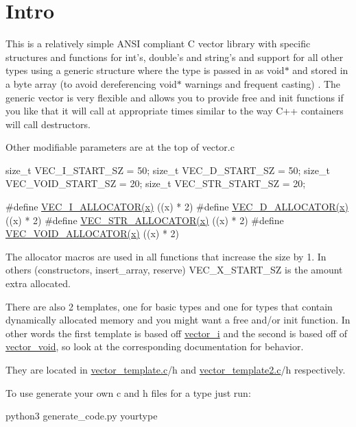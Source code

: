 \hypertarget{index_Intro}{}\section{Intro}\label{index_Intro}
This is a relatively simple A\-N\-S\-I compliant C vector library with specific structures and functions for int's, double's and string's and support for all other types using a generic structure where the type is passed in as void$\ast$ and stored in a byte array (to avoid dereferencing void$\ast$ warnings and frequent casting) . The generic vector is very flexible and allows you to provide free and init functions if you like that it will call at appropriate times similar to the way C++ containers will call destructors.

Other modifiable parameters are at the top of vector.\-c 
\begin{DoxyPre}
size\_t VEC\_I\_START\_SZ = 50;
size\_t VEC\_D\_START\_SZ = 50;
size\_t VEC\_VOID\_START\_SZ = 20;
size\_t VEC\_STR\_START\_SZ = 20;\end{DoxyPre}



\begin{DoxyPre}#define \hyperlink{vector__i_8c_a6d9a8fd1aaa4a8df09d79da016a5c5aa}{VEC\_I\_ALLOCATOR(x)} ((x) * 2)
#define \hyperlink{vector__d_8c_a024a194564bd2419ca1ac75e3cdec3e8}{VEC\_D\_ALLOCATOR(x)} ((x) * 2)
#define \hyperlink{vector__str_8c_ac6b46abc3594994ede1811c5268fa72f}{VEC\_STR\_ALLOCATOR(x)} ((x) * 2)
#define \hyperlink{vector__void_8c_a6f86fe931c02dfbb3d901d2f5e5ec969}{VEC\_VOID\_ALLOCATOR(x)} ((x) * 2)
\end{DoxyPre}
 The allocator macros are used in all functions that increase the size by 1. In others (constructors, insert\-\_\-array, reserve) V\-E\-C\-\_\-\-X\-\_\-\-S\-T\-A\-R\-T\-\_\-\-S\-Z is the amount extra allocated.

There are also 2 templates, one for basic types and one for types that contain dynamically allocated memory and you might want a free and/or init function. In other words the first template is based off \hyperlink{structvector__i}{vector\-\_\-i} and the second is based off of \hyperlink{structvector__void}{vector\-\_\-void}, so look at the corresponding documentation for behavior.

They are located in \hyperlink{vector__template_8c}{vector\-\_\-template.\-c}/h and \hyperlink{vector__template2_8c}{vector\-\_\-template2.\-c}/h respectively.

To use generate your own c and h files for a type just run\-: 
\begin{DoxyPre}
python3 generate\_code.py yourtype
\end{DoxyPre}


